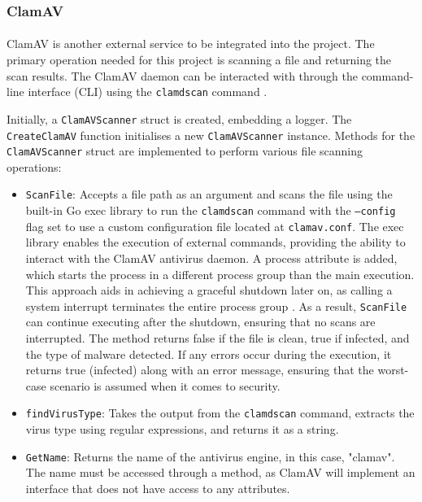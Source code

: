 \documentclass[12pt, conference, final, a4paper, onecolumn, compsoc]{IEEEtran}
\begin{document}
\subsubsection*{ClamAV}
\paragraph{}

ClamAV is another external service to be integrated into the project. The
primary operation needed for this project is scanning a file and returning the
scan results. The ClamAV daemon can be interacted with through the command-line
interface (CLI) using the \texttt{clamdscan} command \citep{clamav-repo}.

Initially, a \texttt{ClamAVScanner} struct is created, embedding a logger. The
\texttt{CreateClamAV} function initialises a new \texttt{ClamAVScanner}
instance. Methods for the \texttt{ClamAVScanner} struct are implemented to
perform various file scanning operations:

\begin{itemize}
  \item \texttt{ScanFile}: Accepts a file path as an argument and scans the file
        using the built-in Go exec library to run the \texttt{clamdscan} command
        with the \texttt{--config} flag set to use a custom configuration file
        located at \texttt{clamav.conf}. The exec library enables the execution
        of external commands, providing the ability to interact with the ClamAV
        antivirus daemon. A process attribute is added, which starts the process
        in a different process group than the main execution. This approach aids
        in achieving a graceful shutdown later on, as calling a system interrupt
        terminates the entire process group \citep{process-groups}. As a result,
        \texttt{ScanFile} can continue executing after the shutdown, ensuring
        that no scans are interrupted. The method returns false if the file is
        clean, true if infected, and the type of malware detected. If any errors
        occur during the execution, it returns true (infected) along with an
        error message, ensuring that the worst-case scenario is assumed when it
        comes to security.
  \item \texttt{findVirusType}: Takes the output from the \texttt{clamdscan}
        command, extracts the virus type using regular expressions, and returns
        it as a string.
  \item \texttt{GetName}: Returns the name of the antivirus engine, in this
        case, "clamav". The name must be accessed through a method, as ClamAV
        will implement an interface that does not have access to any attributes.
\end{itemize}
\end{document}
